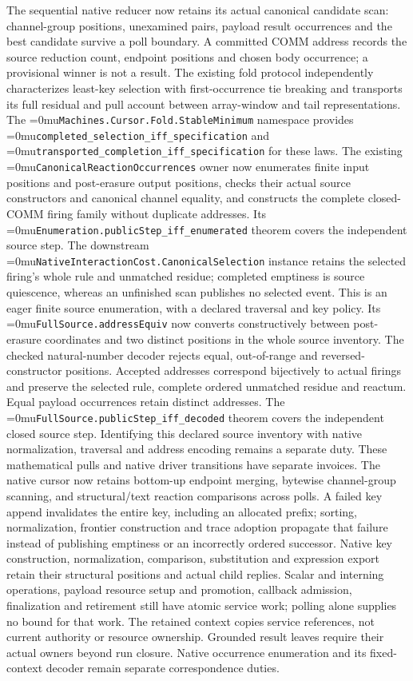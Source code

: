 \documentclass[11pt]{article}
\newcommand{\leanname}[1]{\textup{\Urlmuskip=0mu\relax\nolinkurl{#1}}}
\theoremstyle{definition}
\theoremstyle{remark}
\begin{document}
The sequential native reducer now retains its actual canonical candidate scan:
channel-group positions, unexamined pairs, payload result occurrences and the
best candidate survive a poll boundary. A committed COMM address records the
source reduction count, endpoint positions and chosen body occurrence; a
provisional winner is not a result. The existing fold protocol independently
characterizes least-key selection with first-occurrence tie breaking and
transports its full residual and pull account between array-window and tail
representations. The \leanname{Machines.Cursor.Fold.StableMinimum} namespace
provides \leanname{completed_selection_iff_specification} and
\leanname{transported_completion_iff_specification} for these laws.
The existing \leanname{CanonicalReactionOccurrences} owner now enumerates
finite input positions and post-erasure output positions, checks their actual
source constructors and canonical channel equality, and constructs the complete
closed-COMM firing family without duplicate addresses. Its
\leanname{Enumeration.publicStep_iff_enumerated} theorem covers the independent
source step. The downstream \leanname{NativeInteractionCost.CanonicalSelection}
instance retains the selected firing's whole rule and unmatched residue;
completed emptiness is source quiescence, whereas an unfinished scan publishes
no selected event. This is an eager finite source enumeration, with a declared
traversal and key policy. Its \leanname{FullSource.addressEquiv} now converts
constructively between post-erasure coordinates and two distinct positions in
the whole source inventory. The checked natural-number decoder rejects equal,
out-of-range and reversed-constructor positions. Accepted addresses correspond
bijectively to actual firings and preserve the selected rule, complete ordered
unmatched residue and reactum. Equal payload occurrences retain distinct
addresses. The \leanname{FullSource.publicStep_iff_decoded} theorem covers the
independent closed source step. Identifying this declared source inventory with
native normalization, traversal and address encoding remains a separate duty.
These mathematical pulls and native driver transitions have separate invoices.
The native cursor now retains bottom-up endpoint merging, bytewise channel-group
scanning, and structural/text reaction comparisons across polls. A failed key
append invalidates the entire key, including an allocated prefix; sorting,
normalization, frontier construction and trace adoption propagate that failure
instead of publishing emptiness or an incorrectly ordered successor. Native
key construction, normalization, comparison, substitution and expression export
retain their structural positions and actual child replies. Scalar and
interning operations, payload resource setup and promotion, callback admission,
finalization and retirement still have atomic service work; polling alone
supplies no bound for that work. The retained context
copies service references, not current authority or resource ownership. Grounded
result leaves require their actual owners beyond run closure. Native occurrence
enumeration and its fixed-context decoder remain separate correspondence duties.
\end{document}
